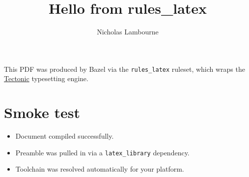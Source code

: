 \documentclass{article}
\title{Hello from rules\_latex}
\author{Nicholas Lambourne}
\begin{document}
\maketitle

This PDF was produced by Bazel via the \texttt{rules\_latex} ruleset, which
wraps the \href{https://tectonic-typesetting.github.io/}{Tectonic} typesetting
engine.

\section*{Smoke test}

\begin{itemize}
    \item Document compiled successfully.
    \item Preamble was pulled in via a \texttt{latex\_library} dependency.
    \item Toolchain was resolved automatically for your platform.
\end{itemize}
\end{document}
